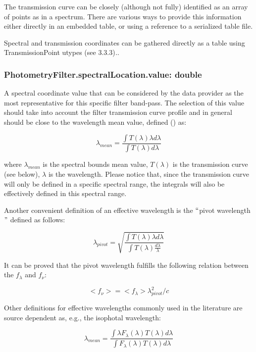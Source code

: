\documentclass[11pt,a4paper]{ivoa}
\begin{document}
The transmission curve can be closely (although not fully) identified as an array of points as in a spectrum. There are various ways to provide this information either directly in an embedded table, or using a reference to a serialized table file.
\par

Spectral and transmission coordinates can be gathered directly as a table using TransmissionPoint utypes (see 3.3.3)\textit{.}.
\par

\subsubsection{PhotometryFilter.spectralLocation.value: double}
A spectral coordinate value that can be considered by the data provider as the most representative for this specific filter band-pass. The selection of this value should take into account the filter transmission curve profile and in general should be close to the wavelength mean value, defined (\cite{1982AJ.....87..670O}) as:
\par
\[
\lambda_{mean} = \frac{\int T(\lambda)\lambda d\lambda}{\int T(\lambda)d\lambda}
\]

where $\lambda_{mean}$ is the spectral bounds mean value, $T(\lambda)$ is the transmission curve (see below), $\lambda$ is the wavelength. Please notice that, since the transmission curve will only be defined in a specific spectral range, the integrals will also be effectively defined in this spectral range.
\par

Another convenient definition of an effective wavelength is the $``$pivot wavelength$"$  defined as follows:
\par

\[
\lambda_{pivot} = \sqrt{\frac{\int T(\lambda)\lambda d\lambda}{\int T(\lambda)\frac{d\lambda}{\lambda}}}
\]

It can be proved that the pivot wavelength fulfills the following relation between the $f_\lambda$ and  $f_\nu $:
\par

\[
<f_\nu >=<f_\lambda >\lambda^2_{pivot}/c
\]

Other definitions for effective wavelengths commonly used in the literature are source dependent as, e.g., the isophotal wavelength:
\par
\[
\lambda_{mean} = \frac{\int \lambda F_\lambda(\lambda)T(\lambda)d\lambda}{\int F_\lambda(\lambda)T(\lambda)d\lambda}
\]
\end{document}
